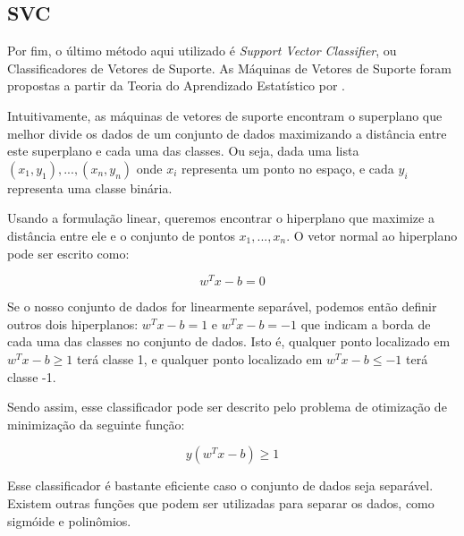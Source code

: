 \subsection{SVC}
\label{section:metodologia:classificadores:svc}

Por fim, o último método aqui utilizado é \textit{Support Vector Classifier}, ou Classificadores de Vetores de Suporte. As Máquinas de Vetores de Suporte foram propostas a partir da Teoria do Aprendizado Estatístico por .

Intuitivamente, as máquinas de vetores de suporte encontram o superplano que melhor divide os dados de um conjunto de dados maximizando a distância entre este superplano e cada uma das classes. Ou seja, dada uma lista $(x_1,y_1),...,(x_n,y_n)$ onde $x_i$ representa um ponto no espaço, e cada $y_i$ representa uma classe binária.

Usando a formulação linear, queremos encontrar o hiperplano que maximize a distância entre ele e o conjunto de pontos $x_1,...,x_n$. O vetor normal ao hiperplano pode ser escrito como:

\begin{equation}
    w^T x-b=0
\end{equation}

Se o nosso conjunto de dados for linearmente separável, podemos então definir outros dois hiperplanos: $w^T x-b=1$ e $w^T x-b=-1$ que indicam a borda de cada uma das classes no conjunto de dados. Isto é, qualquer ponto localizado em $w^T x-b \geq 1$ terá classe 1, e qualquer ponto localizado em $w^T x-b \leq -1$ terá classe -1.

Sendo assim, esse classificador pode ser descrito pelo problema de otimização de minimização da seguinte função:

\begin{equation}
    y(w^T x-b) \geq 1
\end{equation}

Esse classificador é bastante eficiente caso o conjunto de dados seja separável. Existem outras funções que podem ser utilizadas para separar os dados, como sigmóide e polinômios.

